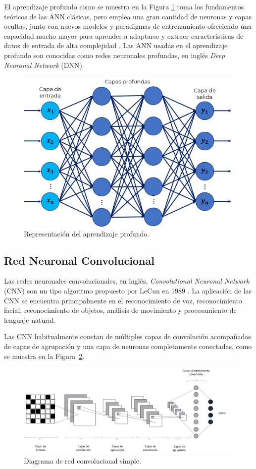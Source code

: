 El aprendizaje profundo como se muestra en la Figura \ref{fig:AP} toma los fundamentos teóricos de las ANN clásicas, pero emplea una gran cantidad de neuronas y capas ocultas, junto con nuevos modelos y paradigmas de entrenamiento ofreciendo una capacidad mucho mayor para aprender a adaptarse y extraer características de datos de entrada de alta complejidad \citep{schmidhuber2015deep}. Las ANN usadas en el aprendizaje profundo son conocidas como redes neuronales profundas, en inglés \textit{Deep Neuronal Network} (DNN).

\begin{figure}[!h]
    \centering
    \includegraphics[width=.5\textwidth]{Imagenes/AP.png}
    \caption{Representación del aprendizaje profundo.}
    \label{fig:AP}
\end{figure}

\subsection{Red Neuronal Convolucional}

Las redes neuronales convolucionales, en inglés, \textit{Convolutional Neuronal Network} (CNN) son un tipo algoritmo propuesto por LeCun en 1989 \citep{lecun1989backpropagation}. La aplicación de las CNN se encuentra principalmente en el reconocimiento de voz, reconocimiento facial, reconocimiento de objetos, análisis de movimiento y procesamiento de lenguaje natural.

Las CNN habitualmente constan de múltiples capas de convolución acompañadas de capas de agrupación y una capa de neuronas completamente conectadas, como se muestra en la Figura~\ref{fig:CNN}.

  \begin{figure}[!h]
     \centering
     \includegraphics[width=.9\textwidth]{Imagenes/CNN.png}
     \caption{Diagrama de red convolucional simple.}
     \label{fig:CNN}
 \end{figure}

